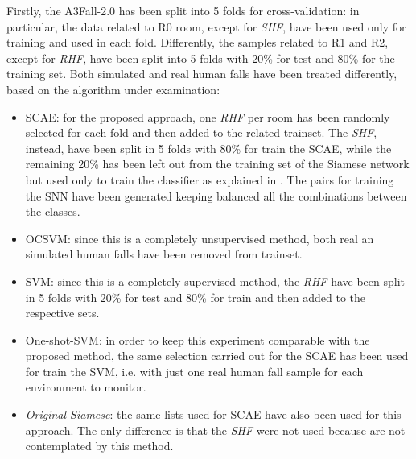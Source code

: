 Firstly, the A3Fall-2.0 has been split into 5 folds for cross-validation: in particular, the data related to R0 room, except for \textit{SHF}, have been used only for training and used in each fold. Differently, the samples related to R1 and R2, except for \textit{RHF}, have been split into 5 folds with 20\% for test and 80\% for the training set. Both simulated and real human falls have been treated differently, based on the algorithm under examination:
\begin{itemize}
	\item SCAE: for the proposed approach, one \textit{RHF} per room has been randomly selected for each fold and then added to the related trainset. The \textit{SHF}, instead, have been split in 5 folds with 80\% for train the SCAE, while the remaining 20\% has been left out from the training set of the Siamese network but used only to train the classifier as explained in  . The pairs for training the SNN have been generated keeping balanced all the combinations between the classes.
	\item OCSVM: since this is a completely unsupervised method, both real an simulated human falls have been removed from trainset.
	\item SVM: since this is a completely supervised method, the \textit{RHF} have been split in 5 folds with 20\% for test and 80\% for train and then added to the respective sets. 
	\item One-shot-SVM: in order to keep this experiment comparable with the proposed method, the same selection carried out for the SCAE has been used for train the SVM, i.e. with just one real human fall sample for each environment to monitor. 
	\item \textit{Original Siamese}: the same lists used for SCAE have also been used for this approach. The only difference is that the \textit{SHF} were not used because are not contemplated by this method.
	
\end{itemize}

